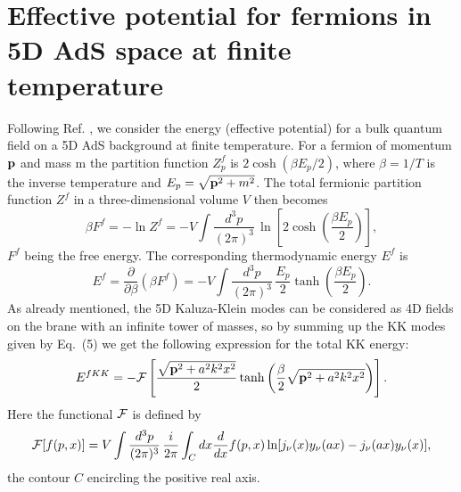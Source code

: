 \documentclass[a4paper,12pt]{article}
\begin{document}
\section{Effective potential for fermions in 5D AdS space at finite temperature}

Following Ref. \cite{brevik01}, we consider the energy (effective potential) for a bulk quantum field on a 5D AdS background at finite temperature. For a fermion of momentum ${\bf p}$ and mass m the partition function $Z_p^f$ is $2\cosh(\beta E_p/2)$, where $\beta=1/T$ is the inverse temperature and $E_p=\sqrt{{\bf p}^2+m^2}$. The total fermionic partition function $Z^f$ in a three-dimensional volume $V$ then becomes
\begin{equation}
\beta F^f=-\ln Z^f = -V\int \frac{d^3p}{(2\pi)^3}\,\ln \left[ 2\cosh \left( \frac{\beta E_p}{2} \right) \right],
\end{equation}
\label{7}
$F^f$ being the free energy. The corresponding thermodynamic energy $E^f$ is
\begin{equation}
E^f=\frac{\partial}{\partial \beta}(\beta F^f)=-V\int \frac{d^3 p}{(2\pi)^3}\, \frac{E_p}{2} \tanh \left(\frac{\beta E_p}{2} \right).
\end{equation}
\label{8}
As already mentioned, the 5D Kaluza-Klein modes can be considered as 4D fields on the brane with an infinite tower of masses, so by summing up the KK modes given by Eq.~(5) we get the following expression for the total KK energy:
\begin{equation}
E^{fKK}=-{\cal{F}} \left[ \frac{\sqrt{{\bf p}^2+a^2k^2 x^2}}{2}\tanh \left( \frac{\beta}{2}\sqrt{{\bf p}^2+a^2k^2x^2}\right)  \right].
\end{equation}
\label{9}
Here the functional $\cal F$ is defined by
\begin{equation}
{\cal F}[f(p,x)]=V\int \frac{d^3p}{(2\pi)^3}\,\frac{i}{2\pi}\int_C dx\frac{d}{dx}f(p,x)
\ln [j_\nu(x)y_\nu(ax)-j_\nu(ax)y_\nu(x)],
\end{equation}
\label{10}
the contour $C$ encircling the positive real axis.
\end{document}

